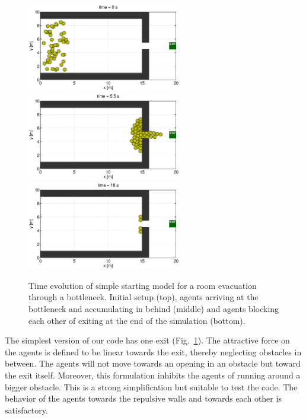 \documentclass[11pt]{article}
\begin{document}
\begin{figure}
	\begin{center}
	\includegraphics[width=0.6\textwidth]
	{figures/Model1_direct_1b_000000.eps}
	\qquad
	\includegraphics[width=0.6\textwidth]
	{figures/Model1_direct_1b_000550.eps}
	\qquad
	\includegraphics[width=0.6\textwidth]
	{figures/Model1_direct_1b_001800.eps}
	\caption{Time evolution of simple starting model for a room evacuation through a bottleneck. Initial setup (top), agents arriving at the bottleneck and accumulating in behind (middle) and agents blocking each other of exiting at the end of the simulation (bottom).}
	\label{fig:simple1}
	\end{center}
\end{figure}

The simplest version of our code has one exit (Fig.~\ref{fig:simple1}). The attractive force on the agents is defined to be linear towards the exit, thereby neglecting obstacles in between. The agents will not move towards an opening in an obstacle but toward the exit itself. Moreover, this formulation inhibits the agents of running around a bigger obstacle. This is a strong simplification but suitable to test the code. The behavior of the agents towards the repulsive walls and towards each other is satisfactory.
\end{document}
